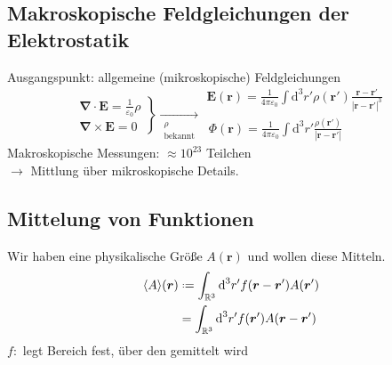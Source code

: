 \documentclass[titlepage,11pt,a4paper,ngerman]{report}
\newcommand*{\defeq}{\mathrel{\vcenter{\baselineskip0.5ex \lineskiplimit0pt \hbox{\scriptsize.}\hbox{\scriptsize.}}}=}
\newcommand{\tx}[1]{\textrm{#1}}
\newcommand{\dd}{\tx{d}}
\renewcommand{\Phi}{\varPhi}
\newcommand{\kq}{\frac{1}{4\pi\epsilon_0}}
\renewcommand{\vec}[1]{\boldsymbol{#1}}
\renewcommand{\epsilon}{\varepsilon}
\begin{document}
\subsection{Makroskopische Feldgleichungen der Elektrostatik}

Ausgangspunkt: allgemeine (mikroskopische) Feldgleichungen
\begin{equation*}
\left.\begin{array}{c}
\vec{\nabla} \cdot \vec{E} = \frac{1}{\epsilon_0} \rho \\[10pt]
\vec{\nabla} \times \vec{E} = 0
\end{array}\right\} \underset{\substack{\rho \\ \tx{bekannt}}}{\rightarrow} \begin{array}{l}
\vec{E}(\vec{r}) = \kq \int \dd ^3 r' \rho(\vec{r}') \frac{\vec{r} - \vec{r}'}{|\vec{r} - \vec{r}'|^3} \\[10pt]
\, \Phi(\vec{r}) = \kq \int \dd ^3 r' \frac{\rho(\vec{r}')}{|\vec{r} - \vec{r}'|}
\end{array}
\end{equation*}
Makroskopische Messungen: $ \approx 10^{23} $ Teilchen\\
$ \rightarrow $ Mittlung über mikroskopische Details.

\subsection{Mittelung von Funktionen}

Wir haben eine physikalische Größe $ A(\vec{r}) $ und wollen diese Mitteln.
\begin{align*}
\langle A \rangle (\vec{r}) &\defeq \int_{\mathbb{R}^3} \dd ^3 r' f(\vec{r} - \vec{r}') A(\vec{r}') \\
&= \int_{\mathbb{R}^3} \dd^3 r' f(\vec{r}') A(\vec{r} - \vec{r}')
\end{align*}
$ f : $ legt Bereich fest, über den gemittelt wird
\end{document}
